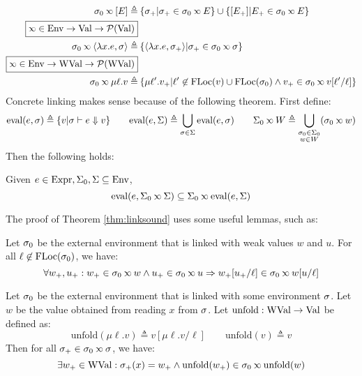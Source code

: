 \documentclass{article}
\begin{document}
\begin{align*}
	\ctx_0\semlink[E]\triangleq                            & \: \{\ctx_+|\ctx_+\in\ctx_0\semlink\event\}\cup\{[\event_+]|\event_+\in\ctx_0\semlink\event\}                                             \\
	\fbox{$\semlink\in\Ctx\rightarrow\Value\rightarrow\pset(\Value)$}                                                                                                                                  \\
	\ctx_0\semlink\langle\lambda x.e,\ctx\rangle\triangleq & \: \{\langle\lambda x.e,\ctx_+\rangle|\ctx_+\in\ctx_0\semlink\ctx\}                                                                       \\
	\fbox{$\semlink\in\Ctx\rightarrow\Walue\rightarrow\pset(\Walue)$}                                                                                                                                  \\
	\ctx_0\semlink\mu\ell.v\triangleq                      & \: \{\mu\ell'.v_+|\ell'\not\in\FLoc(v)\cup\FLoc(\ctx_0)\land v_+\in\ctx_0\semlink v[\ell'/\ell]\}
\end{align*}
Concrete linking makes sense because of the following theorem.
First define:
\[\eval(e,\ctx)\triangleq\{v|\ctx\vdash e\Downarrow v\}\qquad\eval(e,\Sigma)\triangleq\bigcup_{\ctx\in\Sigma}\eval(e,\ctx)\qquad\Sigma_0\semlink W\triangleq\bigcup_{\substack{\ctx_0\in\Sigma_0\\w\in W}}(\ctx_0\semlink w)\]
Then the following holds:
\begin{thm}[Advance]\label{thm:linksound}
	Given $e\in\text{Expr},\Sigma_0,\Sigma\subseteq\text{Env}$,
	\[\eval(e,\Sigma_0\semlink\Sigma)\subseteq\Sigma_0\semlink\eval(e,\Sigma)\]
\end{thm}

The proof of Theorem \ref{thm:linksound} uses some useful lemmas, such as:
\begin{lem}
	Let $\sigma_0$ be the external environment that is linked with weak values $w$ and $u$.
	For all $\ell\not\in\text{FLoc}(\sigma_0)$, we have:
	\[\forall w_+,u_+:w_+\in\ctx_0\semlink w\wedge u_+\in\ctx_0\semlink u\Rightarrow w_+[u_+/\ell]\in\ctx_0\semlink w[u/\ell]\]
\end{lem}
\begin{lem}
	Let $\sigma_0$ be the external environment that is linked with some environment $\sigma$.
	Let $w$ be the value obtained from reading $x$ from $\sigma$.
	Let $\text{unfold}:\text{WVal}\rightarrow\text{Val}$ be defined as:
	\[\text{unfold}(\mu\ell.v)\triangleq v[\mu\ell.v/\ell]\qquad\text{unfold}(v)\triangleq v\]
	Then for all $\ctx_+\in\ctx_0\semlink\ctx$, we have:
	\[\exists w_+\in\Walue:\ctx_+(x)=w_+\land\text{unfold}(w_+)\in\ctx_0\semlink\text{unfold}(w)\]
\end{lem}
\end{document}
